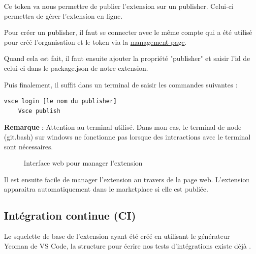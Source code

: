 \documentclass[
    iict, %
    il, %
]{heig-tb}
\begin{document}
Ce token va nous permettre de publier l'extension sur un publisher. Celui-ci permettra de gérer l'extension en ligne.

Pour créer un publisher, il faut se connecter avec le même compte qui a été utilisé pour créé l'organisation et le token via la \href{https://marketplace.visualstudio.com/manage/publishers/}{management page}.

Quand cela est fait, il faut ensuite ajouter la propriété "publisher" et saisir l'id de celui-ci dans le package.json de notre extension.

Puis finalement, il suffit dans un terminal de saisir les commandes suivantes :
\begin{lstlisting}[frame=single]
    vsce login [le nom du publisher]
    Vsce publish
\end{lstlisting}

\textbf{Remarque} : Attention au terminal utilisé. Dans mon cas, le terminal de node (git.bash) sur windows ne fonctionne pas lorsque des interactions avec le terminal sont nécessaires.

\begin{figure}[!h]
    \begin{center}
    \end{center}
    \caption[Interface web pour manager l'extension]{\label{manage-publisher} Interface web pour manager l'extension}
\end{figure}

Il est ensuite facile de manager l'extension au travers de la page web.
L'extension apparaitra automatiquement dans le marketplace si elle est publiée.

\subsection{Intégration continue (CI)}

Le squelette de base de l'extension ayant été créé en utilisant le générateur Yeoman de VS Code, la structure pour écrire nos tests d'intégrations
existe déjà \cite{testing-extension}.
\end{document}
